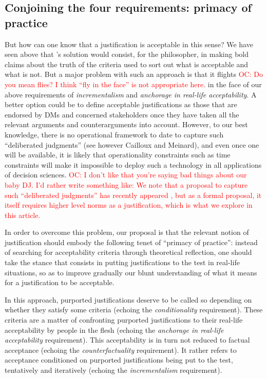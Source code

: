 \documentclass[preprint, french, english, 11pt, authoryear]{elsarticle}%
\newcommand{\commentOC}[1]{\textcolor{red}{OC: #1}}
\begin{document}
\subsection{Conjoining the four requirements: primacy of practice}
But how can one know that a justification is acceptable in this sense? We have seen above that \cite{estlund_democratic_2009}'s solution would consist, for the philosopher, in making bold claims about the truth of the criteria used to sort out what is acceptable and what is not. But a major problem with such an approach is that it flights \commentOC{Do you mean flies? I think “fly in the face” is not appropriate here.} in the face of our above requirements of \emph{incrementalism} and \emph{anchorage in real-life acceptability}. A better option could be to define acceptable justifications as those that are endorsed by \acp{DM} and concerned stakeholders once they have taken all the relevant arguments and counterarguments into account. However, to our best knowledge, there is no operational framework to date to capture such “deliberated judgments” (see however Cailloux and Meinard), and even once one will be available, it is likely that operationality constraints such as time constraints will make it impossible to deploy such a technology in all applications of decision sciences. \commentOC{I don’t like that you’re saying bad things about our baby DJ. I’d rather write something like: We note that a proposal to capture such “deliberated judgments” has recently appeared \citep{cailloux_formal_2018}, but as a formal proposal, it itself requires higher level norms as a justification, which is what we explore in this article.} 

In order to overcome this problem, our proposal is that the relevant notion of justification should embody the following tenet of “primacy of practice”: instead of searching for acceptability criteria through theoretical reflection, one should take the stance that consists in putting justifications to the test in real-life situations, so as to improve gradually our blunt understanding of what it means for a justification to be acceptable.

In this approach, purported justifications deserve to be called so depending on whether they satisfy some criteria (echoing the \emph{conditionality} requirement). These criteria are a matter of confronting purported justifications to their real-life acceptability by people in the flesh (echoing the \emph{anchorage in real-life acceptability} requirement). This acceptability is in turn not reduced to factual acceptance (echoing the \emph{counterfactuality} requirement). It rather refers to acceptance conditioned on purported justifications being put to the test, tentatively and iteratively (echoing the \emph{incrementalism} requirement).
\end{document}
